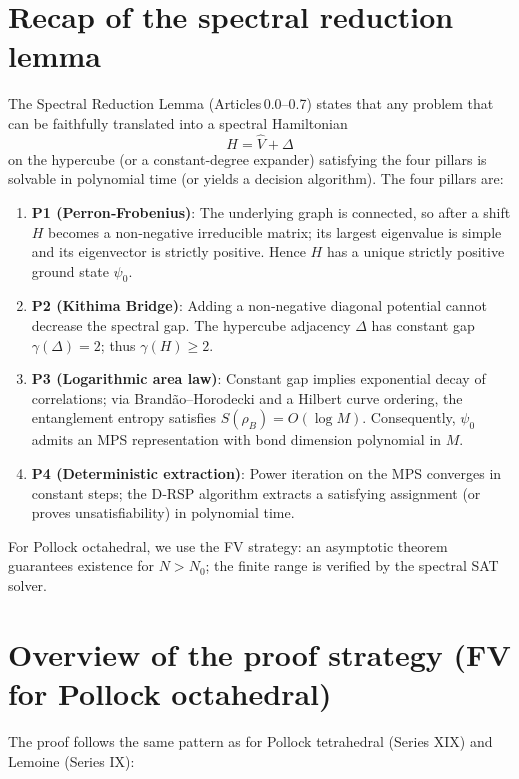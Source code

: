 \documentclass[11pt,a4paper]{article}
\begin{document}
\section{Recap of the spectral reduction lemma}

The Spectral Reduction Lemma (Articles 0.0–0.7) states that any problem that can be faithfully translated into a spectral Hamiltonian
\[
H = \hat{V} + \Delta
\]
on the hypercube (or a constant‑degree expander) satisfying the four pillars is solvable in polynomial time (or yields a decision algorithm). The four pillars are:

\begin{enumerate}
\item \textbf{P1 (Perron‑Frobenius)}: The underlying graph is connected, so after a shift \(H\) becomes a non‑negative irreducible matrix; its largest eigenvalue is simple and its eigenvector is strictly positive. Hence \(H\) has a unique strictly positive ground state \(\psi_0\).
\item \textbf{P2 (Kithima Bridge)}: Adding a non‑negative diagonal potential cannot decrease the spectral gap. The hypercube adjacency \(\Delta\) has constant gap \(\gamma(\Delta)=2\); thus \(\gamma(H) \ge 2\).
\item \textbf{P3 (Logarithmic area law)}: Constant gap implies exponential decay of correlations; via Brandão–Horodecki and a Hilbert curve ordering, the entanglement entropy satisfies \(S(\rho_B)=O(\log M)\). Consequently, \(\psi_0\) admits an MPS representation with bond dimension polynomial in \(M\).
\item \textbf{P4 (Deterministic extraction)}: Power iteration on the MPS converges in constant steps; the D‑RSP algorithm extracts a satisfying assignment (or proves unsatisfiability) in polynomial time.
\end{enumerate}

For Pollock octahedral, we use the FV strategy: an asymptotic theorem guarantees existence for \(N > N_0\); the finite range is verified by the spectral SAT solver.

\section{Overview of the proof strategy (FV for Pollock octahedral)}

The proof follows the same pattern as for Pollock tetrahedral (Series XIX) and Lemoine (Series IX):
\end{document}
